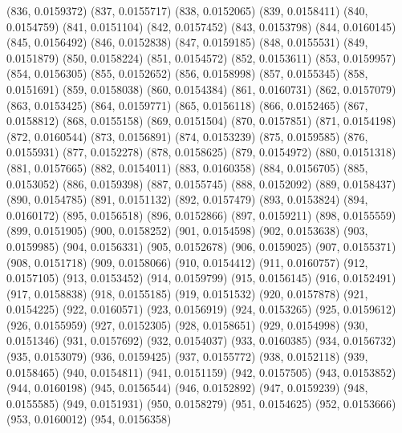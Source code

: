 {					(836, 0.0159372)
					(837, 0.0155717)
					(838, 0.0152065)
					(839, 0.0158411)
					(840, 0.0154759)
					(841, 0.0151104)
					(842, 0.0157452)
					(843, 0.0153798)
					(844, 0.0160145)
					(845, 0.0156492)
					(846, 0.0152838)
					(847, 0.0159185)
					(848, 0.0155531)
					(849, 0.0151879)
					(850, 0.0158224)
					(851, 0.0154572)
					(852, 0.0153611)
					(853, 0.0159957)
					(854, 0.0156305)
					(855, 0.0152652)
					(856, 0.0158998)
					(857, 0.0155345)
					(858, 0.0151691)
					(859, 0.0158038)
					(860, 0.0154384)
					(861, 0.0160731)
					(862, 0.0157079)
					(863, 0.0153425)
					(864, 0.0159771)
					(865, 0.0156118)
					(866, 0.0152465)
					(867, 0.0158812)
					(868, 0.0155158)
					(869, 0.0151504)
					(870, 0.0157851)
					(871, 0.0154198)
					(872, 0.0160544)
					(873, 0.0156891)
					(874, 0.0153239)
					(875, 0.0159585)
					(876, 0.0155931)
					(877, 0.0152278)
					(878, 0.0158625)
					(879, 0.0154972)
					(880, 0.0151318)
					(881, 0.0157665)
					(882, 0.0154011)
					(883, 0.0160358)
					(884, 0.0156705)
					(885, 0.0153052)
					(886, 0.0159398)
					(887, 0.0155745)
					(888, 0.0152092)
					(889, 0.0158437)
					(890, 0.0154785)
					(891, 0.0151132)
					(892, 0.0157479)
					(893, 0.0153824)
					(894, 0.0160172)
					(895, 0.0156518)
					(896, 0.0152866)
					(897, 0.0159211)
					(898, 0.0155559)
					(899, 0.0151905)
					(900, 0.0158252)
					(901, 0.0154598)
					(902, 0.0153638)
					(903, 0.0159985)
					(904, 0.0156331)
					(905, 0.0152678)
					(906, 0.0159025)
					(907, 0.0155371)
					(908, 0.0151718)
					(909, 0.0158066)
					(910, 0.0154412)
					(911, 0.0160757)
					(912, 0.0157105)
					(913, 0.0153452)
					(914, 0.0159799)
					(915, 0.0156145)
					(916, 0.0152491)
					(917, 0.0158838)
					(918, 0.0155185)
					(919, 0.0151532)
					(920, 0.0157878)
					(921, 0.0154225)
					(922, 0.0160571)
					(923, 0.0156919)
					(924, 0.0153265)
					(925, 0.0159612)
					(926, 0.0155959)
					(927, 0.0152305)
					(928, 0.0158651)
					(929, 0.0154998)
					(930, 0.0151346)
					(931, 0.0157692)
					(932, 0.0154037)
					(933, 0.0160385)
					(934, 0.0156732)
					(935, 0.0153079)
					(936, 0.0159425)
					(937, 0.0155772)
					(938, 0.0152118)
					(939, 0.0158465)
					(940, 0.0154811)
					(941, 0.0151159)
					(942, 0.0157505)
					(943, 0.0153852)
					(944, 0.0160198)
					(945, 0.0156544)
					(946, 0.0152892)
					(947, 0.0159239)
					(948, 0.0155585)
					(949, 0.0151931)
					(950, 0.0158279)
					(951, 0.0154625)
					(952, 0.0153666)
					(953, 0.0160012)
					(954, 0.0156358)
}
